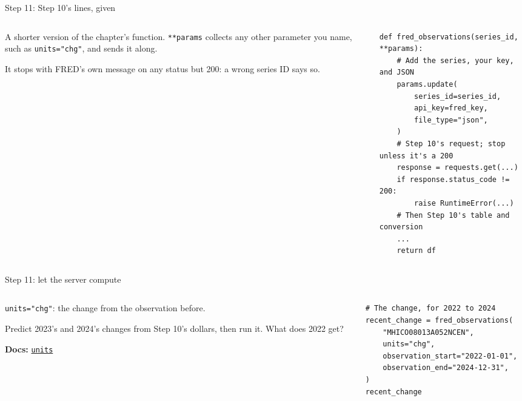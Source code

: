 \documentclass[9pt,aspectratio=169]{beamer}
\begin{document}
\begin{frame}[fragile]{Step 11: Step 10's lines, given}
    \begin{columns}[T]
        \begin{column}{0.37\textwidth}
            A shorter version of the chapter's function. \texttt{**params} collects any other parameter you name, such as \texttt{units="chg"}, and sends it along.

            \medskip
            It stops with FRED's own message on any status but 200: a wrong series ID says so.
        \end{column}
        \begin{column}{0.6\textwidth}
\begin{lstlisting}
def fred_observations(series_id, **params):
    # Add the series, your key, and JSON
    params.update(
        series_id=series_id,
        api_key=fred_key,
        file_type="json",
    )
    # Step 10's request; stop unless it's a 200
    response = requests.get(...)
    if response.status_code != 200:
        raise RuntimeError(...)
    # Then Step 10's table and conversion
    ...
    return df
\end{lstlisting}
        \end{column}
    \end{columns}
\end{frame}

\begin{frame}[fragile]{Step 11: let the server compute}
    \begin{columns}[T]
        \begin{column}{0.37\textwidth}
            \texttt{units="chg"}: the change from the observation before.

            \medskip
            Predict 2023's and 2024's changes from Step 10's dollars, then run it. What does 2022 get?

            \medskip
            {\scriptsize\textbf{Docs:} \href{https://fred.stlouisfed.org/docs/api/fred/series_observations.html\#units}{\texttt{units}}\par}
        \end{column}
        \begin{column}{0.6\textwidth}
\begin{lstlisting}
# The change, for 2022 to 2024
recent_change = fred_observations(
    "MHICO08013A052NCEN",
    units="chg",
    observation_start="2022-01-01",
    observation_end="2024-12-31",
)
recent_change
\end{lstlisting}
        \end{column}
    \end{columns}
\end{frame}
\end{document}
